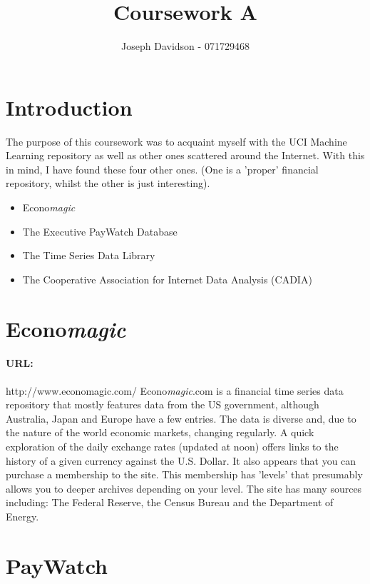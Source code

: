 \documentclass[10pt]{article}
\title{Coursework A}
\author{Joseph Davidson - 071729468}
\date{}
\begin{document}
  \maketitle
  
  \section{Introduction}

  The purpose of this coursework was to acquaint myself with the UCI Machine
  Learning repository as well as other ones scattered around the Internet.
  With this in mind, I have found these four other ones. (One is a 'proper' financial
  repository, whilst the other is just interesting).

  \begin{itemize}
    \item Econo\textit{magic}
    \item The Executive PayWatch Database
    \item The Time Series Data Library
    \item The Cooperative Association for Internet Data Analysis (CADIA) 
  \end{itemize}

  \section{Econo\textit{magic}}
     \paragraph{URL:} http://www.economagic.com/\newline
     Econo\textit{magic}.com is a financial time series data repository that mostly
     features data from the US government, although Australia, Japan and Europe have
     a few entries. The data is diverse and, due to the nature of the world economic
     markets, changing regularly. A quick exploration of the daily exchange rates
     (updated at noon) offers links to the history of a given currency against the U.S.
     Dollar. It also appears that you can purchase a membership to the site. This 
     membership has 'levels' that presumably allows you to deeper archives depending
     on your level. The site has many sources including: The Federal Reserve,
     the Census Bureau and the Department of Energy.    

  \section{PayWatch}
\end{document}
